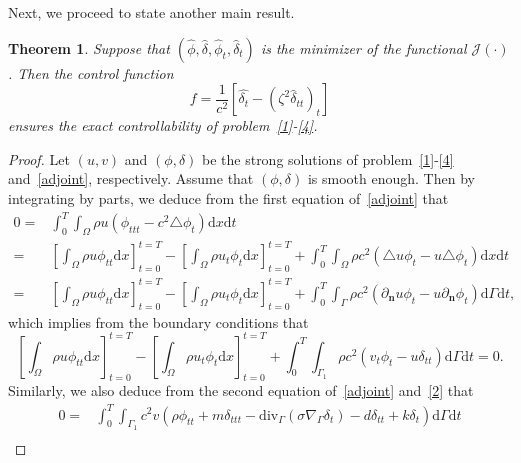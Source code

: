 \documentclass[10pt]{elsarticle}
\newtheorem{theorem}{Theorem}
\begin{document}
Next, we proceed to state another main result.
\begin{theorem}\label{controllability}
Suppose that $(\hat{\phi}, \hat{\delta}, \hat{\phi}_t, \hat{\delta}_t)$ is the minimizer of the functional $\mathcal{J}(\cdot)$. Then the control function 
\[
f = \frac{1}{c^2}\left[\hat{\delta_t} - (\zeta^2\hat{\delta}_{tt})_t\right]
\]
ensures the exact controllability of problem~\eqref{1}-\eqref{4}.
\end{theorem}
\begin{proof}
Let $(u, v)$ and $(\phi, \delta)$ be the strong solutions of problem~\eqref{1}-\eqref{4} and~\eqref{adjoint}, respectively. Assume that $(\phi, \delta)$ is smooth enough. Then by integrating by parts, we deduce from the first equation of~\eqref{adjoint} that
\begin{equation*}
\begin{split}
0=&\int_{0}^{T}\int_{\Omega}\rho u\left( {\phi}_{ttt} - c^2\triangle{\phi_t}\right)\mathrm{d}x \mathrm{d}t\\
=&\left[\int_{\Omega}\rho u {\phi}_{tt} \mathrm{d}x\right]_{t=0}^{t=T} - \left[\int_{\Omega}\rho u_{t} {\phi_t}\mathrm{d}x \right]_{t=0}^{t=T} + \int_{0}^{T}\int_{\Omega}\rho c^2\left( \triangle u{\phi_t} - u\triangle{\phi_t}\right)\mathrm{d}x \mathrm{d}t\\
=&\left[\int_{\Omega}\rho u {\phi}_{tt} \mathrm{d}x\right]_{t=0}^{t=T} - \left[\int_{\Omega}\rho u_{t} {\phi_t}\mathrm{d}x \right]_{t=0}^{t=T} + \int_{0}^{T}\int_{\Gamma}\rho c^2 \left(\partial_{\mathbf{n}}u{\phi_t} - u\partial_{\mathbf{n}}{\phi_t} \right) \mathrm{d}\Gamma \mathrm{d}t,
\end{split}
\end{equation*}
which implies from the boundary conditions that
\begin{equation} \label{explicit_1}
\left[\int_{\Omega}\rho u {\phi}_{tt} \mathrm{d}x\right]_{t=0}^{t=T} - \left[\int_{\Omega}\rho u_{t} {\phi_t}\mathrm{d}x \right]_{t=0}^{t=T} + \int_{0}^{T}\int_{\Gamma_1}\rho c^2 \left(v_{t}{\phi_t} - u{\delta}_{tt} \right) \mathrm{d}\Gamma \mathrm{d}t=0.
\end{equation}
Similarly, we also deduce from the second equation of~\eqref{adjoint} and~\eqref{2} that
\begin{equation}\label{explicit_2}
\begin{split}
0=&\int_{0}^{T}\int_{\Gamma_1}c^{2}v\left( \rho {\phi}_{tt} + m {\delta}_{ttt} - \mathrm{div}_{\Gamma}\left(\sigma\nabla_{\Gamma} {\delta_t}\right) - d {\delta}_{tt} + k {\delta_t} \right)\mathrm{d}\Gamma \mathrm{d}t\\

\end{split}
\end{equation}
\end{proof}
\end{document}
